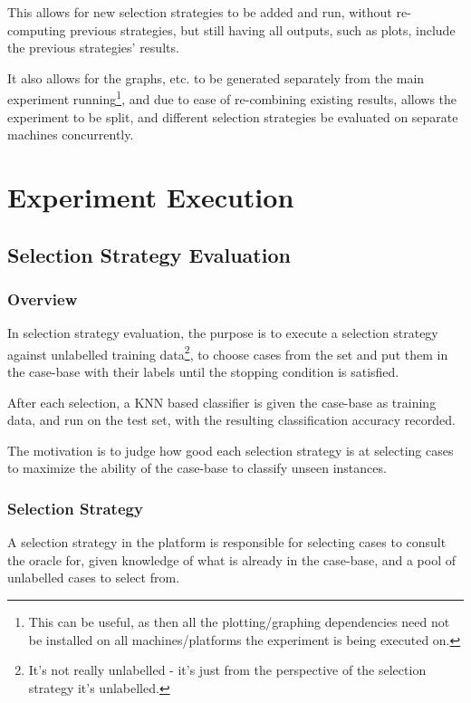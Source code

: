 \documentclass[a4paper,11pt]{report}
\begin{document}
This allows for new selection strategies to be added and run, without re-computing previous strategies, but still having all outputs, such as plots, include the previous strategies' results.

It also allows for the graphs, etc. to be generated separately from the main experiment running\footnote{This can be useful, as then all the plotting/graphing dependencies need not be installed on all machines/platforms the experiment is being executed on.}, and due to ease of re-combining existing results, allows the experiment to be split, and different selection strategies be evaluated on separate machines concurrently.

\section{Experiment Execution}
\subsection{Selection Strategy Evaluation}
\subsubsection{Overview}
In selection strategy evaluation, the purpose is to execute a selection strategy against unlabelled training data\footnote{It's not really unlabelled - it's just from the perspective of the selection strategy it's unlabelled.}, to choose cases from the set and put them in the case-base with their labels until the stopping condition is satisfied.

After each selection, a KNN based classifier is given the case-base as training data, and run on the test set, with the resulting classification accuracy recorded.

The motivation is to judge how good each selection strategy is at selecting cases to maximize the ability of the case-base to classify unseen instances.

\subsubsection{Selection Strategy}

A selection strategy in the platform is responsible for selecting cases to consult the oracle for, given knowledge of what is already in the case-base, and a pool of unlabelled cases to select from.
\end{document}
